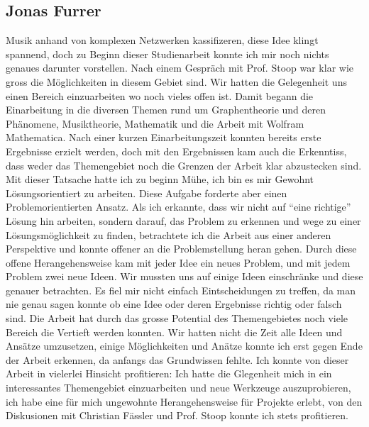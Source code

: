 \subsection{Jonas Furrer} 
Musik anhand von komplexen Netzwerken kassifizeren, diese Idee klingt spannend,
doch zu Beginn dieser Studienarbeit konnte ich mir noch nichts genaues darunter
vorstellen. Nach einem Gespräch mit Prof. Stoop war klar wie gross die
Möglichkeiten in diesem Gebiet sind. Wir hatten die Gelegenheit uns einen
Bereich einzuarbeiten wo noch vieles offen ist. Damit begann die Einarbeitung in
die diversen Themen rund um Graphentheorie und deren Phänomene, Musiktheorie,
Mathematik und die Arbeit mit Wolfram Mathematica. Nach einer kurzen
Einarbeitungszeit konnten bereits erste Ergebnisse erzielt werden, doch mit den
Ergebnissen kam auch die Erkenntiss, dass weder das Themengebiet noch die
Grenzen der Arbeit klar abzustecken sind. Mit dieser Tatsache hatte ich zu
beginn Mühe, ich bin es mir Gewohnt Lösungsorientiert zu arbeiten. Diese Aufgabe
forderte aber einen Problemorientierten Ansatz. Als ich erkannte, dass wir nicht
auf \enquote{eine richtige} Lösung hin arbeiten, sondern darauf, das Problem zu
erkennen und wege zu einer Lösungsmöglichkeit zu finden, betrachtete ich die
Arbeit aus einer anderen Perspektive und konnte offener an die Problemstellung
heran gehen. Durch diese offene Herangehensweise kam mit jeder Idee ein neues
Problem, und mit jedem Problem zwei neue Ideen. Wir mussten uns auf einige Ideen
einschränke und diese genauer betrachten. Es fiel mir nicht einfach
Eintscheidungen zu treffen, da man nie genau sagen konnte ob eine Idee oder
deren Ergebnisse richtig oder falsch sind. Die Arbeit hat durch das grosse
Potential des Themengebietes noch viele Bereich die Vertieft werden konnten. Wir
hatten nicht die Zeit alle Ideen und Ansätze umzusetzen, einige Möglichkeiten
und Anätze konnte ich erst gegen Ende der Arbeit erkennen, da anfangs das
Grundwissen fehlte. Ich konnte von dieser Arbeit in vielerlei Hinsicht
profitieren: Ich hatte die Glegenheit mich in ein interessantes Themengebiet
einzuarbeiten und neue Werkzeuge auszuprobieren, ich habe eine für mich
ungewohnte Herangehensweise für Projekte erlebt, von den Diskusionen mit
Christian Fässler und Prof. Stoop konnte ich stets profitieren.
